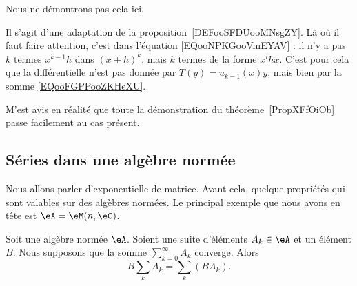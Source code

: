 \begin{normaltext}
    Nous ne démontrons pas cela ici.

    Il s'agit d'une adaptation de la proposition~\ref{DEFooSFDUooMNsgZY}. Là où il faut faire attention, c'est dans l'équation \eqref{EQooNPKGooVmEYAV} : il n'y a pas \( k\) termes \( x^{k-1}h\) dans \( (x+h)^k\), mais \( k\) termes de la forme \( x^ihx\). C'est pour cela que la différentielle n'est pas donnée par \( T(y)=u_{k-1}(x)y\), mais bien par la somme \eqref{EQooFGPPooZKHeXU}.

    M'est avis en réalité que toute la démonstration du théorème~\ref{PropXFfOiOb} passe facilement au cas présent.
\end{normaltext}

\subsection{Séries dans une algèbre normée}

Nous allons parler d'exponentielle de matrice. Avant cela, quelque propriétés qui sont valables sur des algèbres normées. Le principal exemple que nous avons en tête est \( \eA=\eM(n,\eC)\).

\begin{proposition}      \label{PROPooMZZQooEhQsgQ}
    Soit une algèbre normée \( \eA\). Soient une suite d'éléments \( A_k\in \eA\) et un élément \( B\). Nous supposons que la somme \( \sum_{k=0}^{\infty}A_k\) converge. Alors
    \begin{equation}
        B\sum_kA_k=\sum_k(BA_k).
    \end{equation}
\end{proposition}

